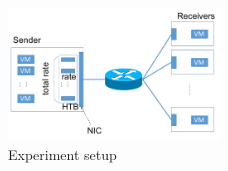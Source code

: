 \begin{figure}[!t]
\centering
\includegraphics[width=0.5\textwidth]{rate_limiter/figs/exp_setup.pdf}
\caption{Experiment setup}
\label{fig:exp-setup} 
\end{figure}
